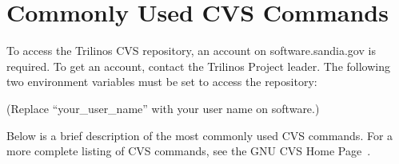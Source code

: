 \documentclass[12pt,relax]{TrilinosDevGuide}
\begin{document}
\clearpage



\appendix
\section{Commonly Used CVS Commands}
\label{Section:CVS}
To access the Trilinos CVS repository, an account on software.sandia.gov is 
required.  To get an account, contact the Trilinos Project leader.  
The following two 
environment variables must be set to access the repository:


(Replace ``your\_user\_name'' with your user name on software.)

Below is a brief description of the most commonly used CVS commands.  For a 
more complete listing of CVS commands, see the GNU CVS Home Page~\cite{CVS}.
\end{document}
